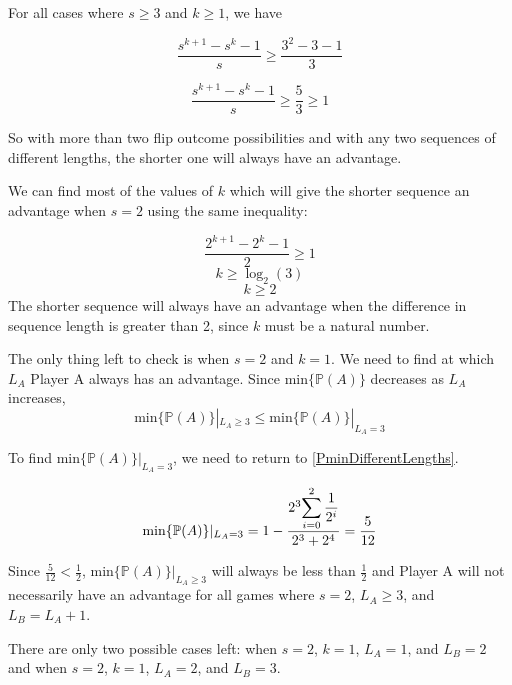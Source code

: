 \documentclass[english,12pt,a4paper,final]{article}
\begin{document}
For all cases where $s \ge 3$ and $k \ge 1$, we have 

\begin{equation*}
	\frac{s^{k+1}-s^k-1}{s} \ge \frac{3^2-3-1}{3}
\end{equation*}

\begin{equation*}
	\frac{s^{k+1}-s^k-1}{s} \ge \frac{5}{3} \ge 1
\end{equation*}

So with more than two flip outcome possibilities and with any two sequences of different lengths, the shorter one will always have an advantage.

We can find most of the values of $k$ which will give the shorter sequence an advantage when $s=2$ using the same inequality:

\begin{equation*}
	\frac{2^{k+1}-2^k-1}{2} \ge 1
\end{equation*}
\begin{equation*}
	k \ge \log_2(3)
\end{equation*}
\begin{equation*}
	k \ge 2
\end{equation*}
The shorter sequence will always have an advantage when the difference in sequence length is greater than 2, since $k$ must be a natural number.

The only thing left to check is when $s=2$ and $k=1$. We need to find at which $L_A$ Player A always has an advantage. Since $\text{min}\{\mathbb{P}(A)\}$ decreases as $L_A$ increases,
\begin{equation*}
	\text{min}\{\mathbb{P}(A)\}|_{L_A \ge 3} \le \text{min}\{\mathbb{P}(A)\}|_{L_A = 3}
\end{equation*}

To find $\text{min}\{\mathbb{P}(A)\}|_{L_A = 3}$, we need to return to \eqref{PminDifferentLengths}. 

\begin{equation*}
	\text{min}\{\mathbb{P}(A)\}|_{L_A = 3} = 1-\frac{2^3 \mathlarger{\sum_{i=0}^{2} \frac{1}{2^i}}}{2^3+2^4} = \frac{5}{12}
\end{equation*}

Since $\frac{5}{12} < \frac{1}{2}$, $\text{min}\{\mathbb{P}(A)\}|_{L_A \ge 3}$ will always be less than $\frac{1}{2}$ and Player A will not necessarily have an advantage for all games where $s=2$, $L_A \ge 3$, and $L_B = L_A + 1$.

There are only two possible cases left: when $s=2$, $k=1$, $L_A=1$, and $L_B=2$ and when $s=2$, $k=1$, $L_A=2$, and $L_B=3$. 
\end{document}
